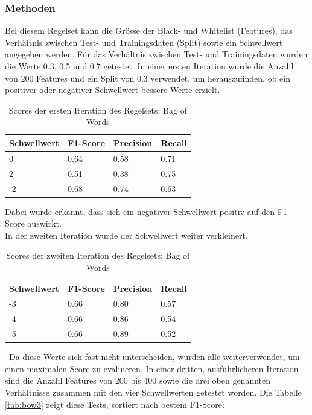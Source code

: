 \subsubsection{Methoden}
Bei diesem Regelset kann die Grösse der Black- und Whitelist (Features), das Verhältnis zwischen Test- und Trainingsdaten (Split) sowie ein Schwellwert angegeben werden.
Für das Verhältnis zwischen Test- und Trainingsdaten wurden die Werte 0.3, 0.5 und 0.7 getestet.
In einer ersten Iteration wurde die Anzahl von 200 Features und ein Split von 0.3 verwendet, um herauszufinden, ob ein positiver oder negativer Schwellwert bessere Werte erzielt.\\
\begin{table}[H]
	\caption{Scores der ersten Iteration des Regelsets: Bag of Words}
	\centering
	\begin{tabular}{|l|l|l|l|}
		\hline
		Schwellwert & F1-Score & Precision & Recall\\
		\hline
		0 & 0.64 & 0.58 & 0.71 \\
		2 & 0.51 & 0.38 & 0.75 \\
		-2 & 0.68 & 0.74 & 0.63 \\
		\hline
	\end{tabular}
\end{table}
Dabei wurde erkannt, dass sich ein negativer Schwellwert positiv auf den F1-Score auswirkt.\\
In der zweiten Iteration wurde der Schwellwert weiter verkleinert.\\
\begin{table}[H]
	\caption{Scores der zweiten Iteration des Regelsets: Bag of Words}
	\centering
	\begin{tabular}{|l|l|l|l|}
		\hline
		Schwellwert & F1-Score & Precision & Recall\\
		\hline
		-3 & 0.66 & 0.80 & 0.57 \\
		-4 & 0.66 & 0.86 & 0.54 \\
		-5 & 0.66 & 0.89 & 0.52 \\
		\hline
	\end{tabular}
\end{table}\
Da diese Werte sich fast nicht unterscheiden, wurden alle weiterverwendet, um einen maximalen Score zu evaluieren.
In einer dritten, ausführlicheren Iteration sind die Anzahl Features von 200 bis 400 sowie die drei oben genannten Verhältnisse zusammen mit den vier Schwellwerten getestet worden. Die Tabelle \cref{tab:bow3} zeigt diese Tests, sortiert nach bestem F1-Score:\\
\FloatBarrier

